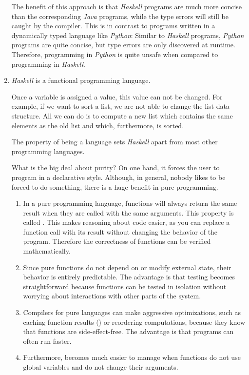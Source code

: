 \begin{enumerate}
  The benefit of this approach is that \textsl{Haskell} programs are much more concise than the corresponding
  \textsl{Java} programs, while the type errors will still be caught by the compiler.  This is in
  contrast to programs written in a dynamically typed language like \textsl{Python}: Similar to
  \textsl{Haskell} programs, \textsl{Python} programs are quite concise, but type errors are only
  discovered at runtime.  Therefore, programming in \textsl{Python} is quite unsafe when compared to
  programming in \textsl{Haskell}.

\item \textsl{Haskell} is a  functional programming language.

  Once a variable is assigned a value, this value can not be changed.  For example, if we want to sort a list,
  we are not able to change the list data structure.  All we can do is to compute a new list which contains the
  same elements as the old list and which, furthermore, is sorted.

  The property of being a  language sets \textsl{Haskell} apart from most other programming
  languages.
  
  What is the big deal about purity?  On one hand, it forces
  the user to program in a declarative style.  Although, in general, nobody likes to be forced to do something,
  there is a huge benefit in pure programming.
  \begin{enumerate}
  \item In a pure programming language, functions will always return the same result when they are called with
    the same arguments.  This property is called .
    This makes reasoning about code easier, as you can replace a function call with its result without changing
    the behavior of the program.  Therefore the correctness of functions can be verified mathematically.
  \item Since pure functions do not depend on or modify external state, their behavior is entirely predictable.
    The advantage is that testing becomes straightforward because functions can be tested in isolation without
    worrying about interactions with other parts of the system. 
  \item Compilers for pure languages can make aggressive optimizations, such as caching function results
    () or reordering computations, because they know that functions are side-effect-free. 
    The advantage is that programs can often run faster.
  \item Furthermore,  becomes much easier to manage when functions do not use global variables and do
    not change their arguments.
  \end{enumerate}
  

\end{enumerate}

